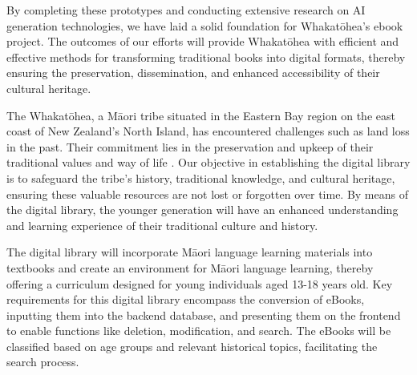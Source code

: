 By completing these prototypes and conducting extensive research on AI generation technologies, we have laid a solid foundation for Whakatōhea's ebook project. The outcomes of our efforts will provide Whakatōhea with efficient and effective methods for transforming traditional books into digital formats, thereby ensuring the preservation, dissemination, and enhanced accessibility of their cultural heritage.

The Whakatōhea, a Māori tribe situated in the Eastern Bay region on the east coast of New Zealand's North Island, has encountered challenges such as land loss in the past. Their commitment lies in the preservation and upkeep of their traditional values and way of life \autocite{Whakatoh25:online}. Our objective in establishing the digital library is to safeguard the tribe's history, traditional knowledge, and cultural heritage, ensuring these valuable resources are not lost or forgotten over time. By means of the digital library, the younger generation will have an enhanced understanding and learning experience of their traditional culture and history.

The digital library will incorporate Māori language learning materials into textbooks and create an environment for Māori language learning, thereby offering a curriculum designed for young individuals aged 13-18 years old. Key requirements for this digital library encompass the conversion of eBooks, inputting them into the backend database, and presenting them on the frontend to enable functions like deletion, modification, and search. The eBooks will be classified based on age groups and relevant historical topics, facilitating the search process.
